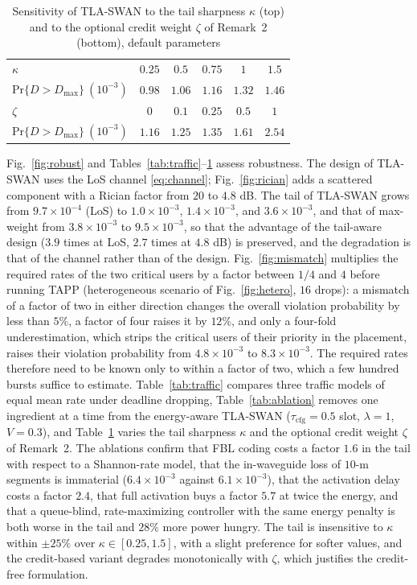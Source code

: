 \documentclass[journal]{IEEEtran}
\renewcommand{\Pr}{\mathrm{Pr}}
\newcommand{\Dmax}{D_{\max}}
\begin{document}
\begin{table}[t]
\caption{Sensitivity of TLA-SWAN to the tail sharpness $\kappa$ (top) and to the optional credit weight $\zeta$ of Remark~2 (bottom), default parameters}
\label{tab:sens}
\centering
\scriptsize
\setlength{\tabcolsep}{3.5pt}
\begin{tabular}{lccccc}
\toprule
$\kappa$ & $0.25$ & $0.5$ & $0.75$ & $1$ & $1.5$\\
$\Pr\{D>\Dmax\}\ (10^{-3})$ & $0.98$ & $1.06$ & $1.16$ & $1.32$ & $1.46$\\
\midrule
$\zeta$ & $0$ & $0.1$ & $0.25$ & $0.5$ & $1$\\
$\Pr\{D>\Dmax\}\ (10^{-3})$ & $1.16$ & $1.25$ & $1.35$ & $1.61$ & $2.54$\\
\bottomrule
\end{tabular}
\end{table}
Fig.~\ref{fig:robust} and Tables~\ref{tab:traffic}--\ref{tab:sens} assess robustness. The design of TLA-SWAN uses the LoS channel \eqref{eq:channel}; Fig.~\ref{fig:rician} adds a scattered component with a Rician factor from $20$ to $4.8$ dB. The tail of TLA-SWAN grows from $9.7\times10^{-4}$ (LoS) to $1.0\times10^{-3}$, $1.4\times10^{-3}$, and $3.6\times10^{-3}$, and that of max-weight from $3.8\times10^{-3}$ to $9.5\times10^{-3}$, so that the advantage of the tail-aware design ($3.9$ times at LoS, $2.7$ times at $4.8$ dB) is preserved, and the degradation is that of the channel rather than of the design. Fig.~\ref{fig:mismatch} multiplies the required rates of the two critical users by a factor between $1/4$ and $4$ before running TAPP (heterogeneous scenario of Fig.~\ref{fig:hetero}, $16$ drops): a mismatch of a factor of two in either direction changes the overall violation probability by less than $5\%$, a factor of four raises it by $12\%$, and only a four-fold underestimation, which strips the critical users of their priority in the placement, raises their violation probability from $4.8\times10^{-3}$ to $8.3\times10^{-3}$. The required rates therefore need to be known only to within a factor of two, which a few hundred bursts suffice to estimate. Table~\ref{tab:traffic} compares three traffic models of equal mean rate under deadline dropping, Table~\ref{tab:ablation} removes one ingredient at a time from the energy-aware TLA-SWAN ($\tau_{\mathrm{cfg}}=0.5$ slot, $\lambda=1$, $V=0.3$), and Table~\ref{tab:sens} varies the tail sharpness $\kappa$ and the optional credit weight $\zeta$ of Remark~2. The ablations confirm that FBL coding costs a factor $1.6$ in the tail with respect to a Shannon-rate model, that the in-waveguide loss of $10$-m segments is immaterial ($6.4\times10^{-3}$ against $6.1\times10^{-3}$), that the activation delay costs a factor $2.4$, that full activation buys a factor $5.7$ at twice the energy, and that a queue-blind, rate-maximizing controller with the same energy penalty is both worse in the tail and $28\%$ more power hungry. The tail is insensitive to $\kappa$ within $\pm25\%$ over $\kappa\in[0.25,1.5]$, with a slight preference for softer values, and the credit-based variant degrades monotonically with $\zeta$, which justifies the credit-free formulation.
\end{document}
